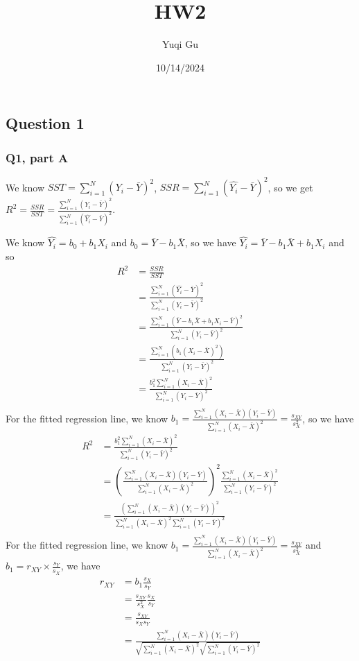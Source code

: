 \documentclass[
]{article}
\title{HW2}
\author{Yuqi Gu}
\date{10/14/2024}
\begin{document}
\maketitle

\hypertarget{question-1}{%
\subsection{Question 1}\label{question-1}}

\hypertarget{q1-part-a}{%
\subsubsection{Q1, part A}\label{q1-part-a}}

We know \(SST = \sum_{i=1}^N (Y_i - \bar{Y})^2\),
\(SSR = \sum_{i=1}^N (\hat{Y_i} - \bar{Y})^2\), so we get
\(R^2=\frac{SSR}{SST} = \frac{\sum_{i=1}^N (Y_i - \bar{Y})^2}{\sum_{i=1}^N (\hat{Y_i} - \bar{Y})^2}\).

We know \(\hat{Y_i} = b_0 + b_1X_i\) and \(b_0 = \bar{Y}-b_1\bar{X}\),
so we have \(\hat{Y_i} = \bar{Y} - b_1\bar{X} + b_1X_i\) and so \[
\begin{aligned}
R^2 &= \frac{SSR}{SST} \\
    &= \frac{\sum_{i=1}^N (\hat{Y_i} - \bar{Y})^2}{\sum_{i=1}^N (Y_i - \bar{Y})^2} \\
    &= \frac{\sum_{i=1}^N (\bar{Y} - b_1\bar{X} + b_1X_i - \bar{Y})^2}{\sum_{i=1}^N (Y_i - \bar{Y})^2} \\
    &= \frac{\sum_{i=1}^N (b_1(X_i-\bar{X})^2)}{\sum_{i=1}^N (Y_i - \bar{Y})^2} \\
    &= \frac{b_1^2\sum_{i=1}^N (X_i-\bar{X})^2}{\sum_{i=1}^N (Y_i - \bar{Y})^2} \\
\end{aligned}
\] For the fitted regression line, we know
\(b_1 = \frac{\sum_{i=1}^N (X_i - \bar{X})(Y_i - \bar{Y})}{\sum_{i=1}^N (X_i - \bar{X})^2} = \frac{s_{XY}}{s_X^2}\),
so we have \[
\begin{aligned}
R^2 &= \frac{b_1^2\sum_{i=1}^N (X_i-\bar{X})^2}{\sum_{i=1}^N (Y_i - \bar{Y})^2} \\
    &= \left(\frac{\sum_{i=1}^N (X_i - \bar{X})(Y_i - \bar{Y})}{\sum_{i=1}^N (X_i - \bar{X})^2}\right)^2
    \frac{\sum_{i=1}^N (X_i-\bar{X})^2}{\sum_{i=1}^N (Y_i - \bar{Y})^2} \\
    &= \frac{(\sum_{i=1}^N (X_i - \bar{X})(Y_i - \bar{Y}))^2}{\sum_{i=1}^N (X_i - \bar{X})^2\sum_{i=1}^N (Y_i - \bar{Y})^2} \\
\end{aligned}
\] For the fitted regression line, we know
\(b_1 = \frac{\sum_{i=1}^N (X_i - \bar{X})(Y_i - \bar{Y})}{\sum_{i=1}^N (X_i - \bar{X})^2} = \frac{s_{XY}}{s_X^2}\)
and \(b_1 = r_{XY} \times \frac{s_Y}{s_X}\), we have \[
\begin{aligned}
r_{XY} &= b_1 \frac{s_X}{s_Y} \\
       &= \frac{s_{XY}}{s_X^2} \frac{s_X}{s_Y} \\
       &= \frac{s_{XY}}{s_Xs_Y} \\
       &= \frac{\sum_{i=1}^N (X_i - \bar{X})(Y_i - \bar{Y})}{\sqrt{\sum_{i=1}^N (X_i - \bar{X})^2} \sqrt{\sum_{i=1}^N (Y_i - \bar{Y})^2}}
\end{aligned}
\]
\end{document}
